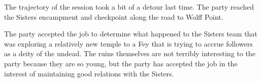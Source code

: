 The trajectory of the session took a bit of a detour last time.
The party reached the Sisters encampment and checkpoint along the road to Wolff Point.

The party accepted the job to determine what happened to the Sisters team that was exploring a relatively new temple to a Fey that is trying to accrue followers as a deity of the undead.
The ruins themselves are not terribly interesting to the party because they are so young, but the party has accepted the job in the interest of maintaining good relations with the Sisters.
